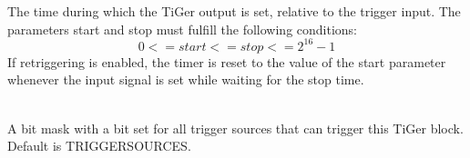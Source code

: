 
			\\
			\\
			The time during which the TiGer output is set, relative to the trigger input. The parameters \textsf{start} and \textsf{stop} must fulfill the following conditions:
			\[ 0 <= start <= stop <= 2^{16}-1 \]
			If retriggering is enabled, the timer is reset to the value of the start parameter whenever the input signal is set while waiting for the stop time. \par
			
	
			\\
			A bit mask with a bit set for all trigger sources that can trigger this TiGer block. 
			Default is \textsf{\PREFIX TRIGGER\tu SOURCE\tu S}.\par
	
